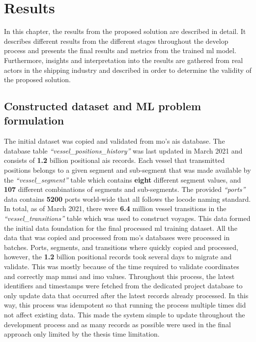 \chapter{Results}
\label{chap:results}

In this chapter, the results from the proposed solution are described in detail. It describes different results from the different stages throughout the develop process and presents the final results and metrics from the trained \acrfull{ml} model. Furthermore, insights and interpretation into the results are gathered from real actors in the shipping industry and described in order to determine the validity of the proposed solution.

\section{Constructed dataset and ML problem formulation}

The initial dataset was copied and validated from \acrfull{mo}'s \acrshort{ais} database. The database table \textit{``vessel\_positions\_history''} was last updated in March 2021 and consists of \textbf{1.2} billion positional \acrshort{ais} records. Each vessel that transmitted positions belongs to a given segment and sub-segment that was made available by the \textit{``vessel\_segment''} table which contains \textbf{eight} different segment values, and \textbf{107} different combinations of segments and sub-segments. The provided \textit{``ports''} data contains \textbf{5200} ports world-wide that all follows the \gls{locode} naming standard. In total, as of March 2021, there were \textbf{6.4} million vessel transitions in the \textit{``vessel\_transitions''} table which was used to construct voyages. This data formed the initial data foundation for the final processed \acrfull{ml} training dataset. All the data that was copied and processed from \acrshort{mo}'s databases were processed in batches. Ports, segments, and transitions where quickly copied and processed, however, the \textbf{1.2} billion positional records took several days to migrate and validate. This was mostly because of the time required to validate coordinates and correctly map \acrshort{mmsi} and \acrshort{imo} values. Throughout this process, the latest identifiers and timestamps were fetched from the dedicated project database to only update data that occurred after the latest records already processed. In this way, this process was idempotent so that running the process multiple times did not affect existing data. This made the system simple to update throughout the development process and as many records as possible were used in the final approach only limited by the thesis time limitation.


